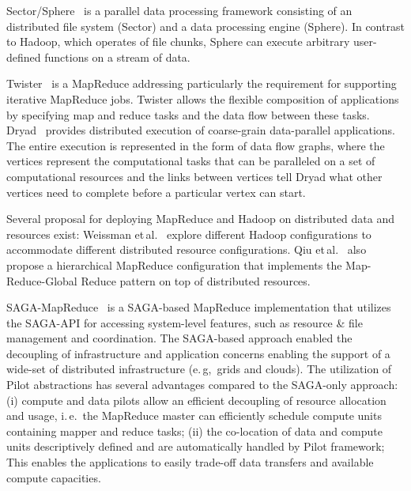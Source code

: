 \documentclass{acm_proc_article-sp}
\newcommand{\pnote}[1]{ {\textcolor{magenta} { ***pradeep: #1 }}}
\newcommand{\thirdrev}[1]{ {\textcolor{Bittersweet} { ***reviewer3: #1 }}}
\newcommand{\pnote}[1]{}
\begin{document}

Sector/Sphere~\cite{Gu_Grossman_2009} is a parallel data processing framework
consisting of an distributed file system (Sector) and a data processing engine
(Sphere). In contrast to Hadoop, which operates of file chunks, Sphere can 
execute arbitrary user-defined functions on a stream of data. 

Twister~\cite{Ekanayake:2010:TRI:1851476.1851593} is a 
MapReduce addressing particularly the requirement for supporting iterative 
MapReduce jobs. Twister allows the flexible composition of applications by 
specifying map and reduce tasks and the data flow between these tasks. 
Dryad~\cite{Isard:2007:DDD:1272998.1273005} provides distributed execution of
coarse-grain data-parallel applications. The entire execution is represented in
the form of data flow graphs, where the vertices represent the computational
tasks that can be paralleled on a set of computational resources and the links
between vertices tell Dryad what other vertices need to complete before a
particular vertex can start.

Several proposal for deploying MapReduce and Hadoop on distributed data and
resources exist: Weissman et\,al.~\cite{weissman-mr-11} explore different Hadoop
configurations to accommodate different distributed resource configurations. 
Qiu et\,al.~\cite{ecmls11-mr-autodock} also propose a hierarchical
MapReduce configuration that implements the Map-Reduce-Global Reduce pattern on 
top of distributed resources. 

SAGA-MapReduce~\cite{Sehgal:2011:UAI:1945091.1945329} is a SAGA-based
MapReduce implementation that utilizes the SAGA-API for accessing system-level
features, such as resource \& file management and coordination. The
SAGA-based approach enabled the decoupling of infrastructure and application
concerns enabling the support of a wide-set of distributed infrastructure
(e.\,g,\ grids and clouds). The utilization of Pilot abstractions has several
advantages compared to the SAGA-only approach: (i) compute and data pilots
allow an efficient decoupling of resource allocation and usage, i.\,e.\ the
MapReduce master can efficiently schedule compute units containing mapper and
reduce tasks; (ii) the co-location of data and compute units descriptively
defined and are automatically handled by Pilot framework; This enables the
applications to easily trade-off data transfers and available compute
capacities.
\end{document}
